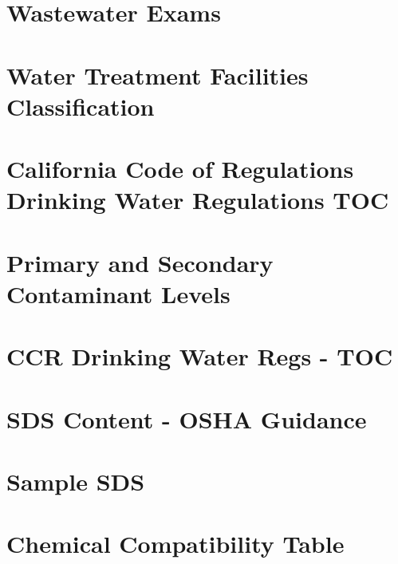 \documentclass[11pt,fleqn]{book} %
\begin{document}
\chapter{Wastewater Exams}\label{appendix:Wastewater Exams}


\chapter{Water Treatment Facilities Classification}\label{appendix:Water Treatment Facilities Classification}


\chapter{California Code of Regulations Drinking Water Regulations TOC}\label{appendix:ccrtoc}


\chapter{Primary and Secondary Contaminant Levels}\label{appendix:EPAPrimaryandSecondaryContaminantLevels}


\chapter{CCR Drinking Water Regs - TOC}\label{appendix:CCR Drinking Water Regs - TOC}
\newpage


\chapter{SDS Content - OSHA Guidance}\label{appendix:SDS Content - OSHA Guidance}


\chapter{Sample SDS}\label{appendix:Sample SDS}


\chapter{Chemical Compatibility Table}\label{appendix:Chemical compatibility table}
\begin{landscape}

\end{landscape}
\end{document}
